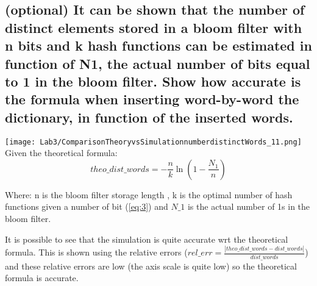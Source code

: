\documentclass[twocolumn,letterpaper]{report}
\begin{document}
{				\subsection{(optional) It can be shown that the number of distinct elements stored in a bloom filter
with n bits and k hash functions can be estimated in function of N1, the actual number of bits equal to 1 in the bloom filter. Show how accurate is the formula when inserting word-by-word the dictionary, in function of the inserted words.}
				\texttt{[image: Lab3/ComparisonTheoryvsSimulationnumberdistinctWords\_11.png]} \\
				Given the theoretical formula: 
				\[ theo\_dist\_words = - \frac{n}{k} \ln \left( 1 - \frac{N_1}{n} \right) \]
				\begin{center}
				Where: n is the bloom filter storage length , k is the optimal number of hash functions given a number of bit  (\ref{eq:3}) and $N\_1$ is the actual number of 1s in the bloom filter. 
				\end{center}
				It is possible to see that the simulation is quite accurate wrt the theoretical formula. This is shown using the relative errors ($ rel\_err=\frac{|theo\_dist\_words-dist\_words|}{dist\_words} $) and these relative errors are low (the axis scale is quite low) so the theoretical formula is accurate.
				
} \fi
\end{document}
